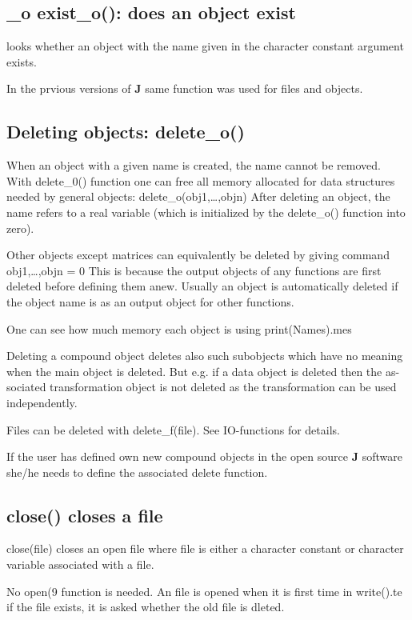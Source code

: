 \subsection{_o exist\_o(): does an object exist}
\label{exist}
looks whether an object with the name given in
the character constant  argument exists.
\begin{note}
In the prvious versions of \textbf{J} same function was used for files and objects.
\end{note}
\subsection{Deleting objects: delete\_o()}
\label{delete}
When an object with a given name is created, the name cannot be removed. With
delete\_0() function one can free all memory allocated for data structures needed
by general objects:
delete\_o(obj1,…,objn)
After deleting an object, the name refers to a real variable (which is
initialized by the delete\_o() function into zero).
\begin{note}
Other objects except matrices can equivalently be deleted by giving
command
obj1,…,objn = 0
This is because the output objects of any functions are first deleted before
defining them anew. Usually an object is automatically deleted if the object
name is as an output object for other functions.
\end{note}
\begin{note}
One can see how much memory each object is using \textcolor{VioletRed}{print}(Names).mes
\end{note}
\begin{note}
Deleting a compound object deletes also such
subobjects which have no meaning when the main object is deleted. But e.g. if a
data object is deleted then the as-sociated transformation object is not
deleted as the transformation can be used independently.
\end{note}
\begin{note}
Files can be deleted with delete\_f(file). See IO-functions for
details.
\end{note}
\begin{note}
If the user has defined own new compound objects in the open source
\textbf{J} software she/he needs to define the associated delete function.
\end{note}
\subsection{\textcolor{VioletRed}{close}() closes a file}
\label{close}
\textcolor{VioletRed}{close}(file) closes an open file where file is either a character constant
or character variable associated with a file.
\begin{note}
No open(9 function is needed. An file is opened when it is first time in \textcolor{VioletRed}{write}().te
if the file exists, it is asked whether the old file is dleted.
\end{note}
